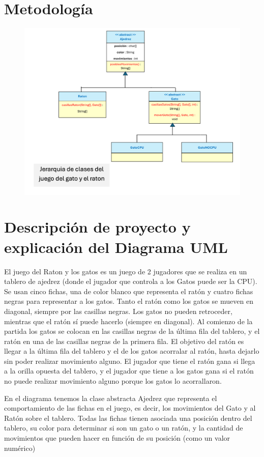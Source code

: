 \documentclass[12pt, Tahoma]{article}
\begin{document}
	\section*{Metodología}
	\begin{figure}[H]
		\centering
		\includegraphics[scale=0.6]{gatoRaton.png}
	\end{figure}
	
	\section*{Descripción de proyecto y explicación del Diagrama UML} El juego del Raton y los gatos es un juego de 2 jugadores que se realiza en un tablero de ajedrez (donde el jugador que controla a los Gatos puede ser la CPU). Se usan cinco fichas, una de color blanco que representa el ratón y cuatro fichas negras para representar a los gatos. Tanto el ratón como los gatos se mueven en diagonal, siempre por las casillas negras. Los gatos no pueden retroceder, mientras que el ratón sí puede hacerlo (siempre en diagonal). Al comienzo de la partida los gatos se colocan en las casillas negras de la última fila del tablero, y el ratón en una de las casillas negras de la primera fila. El objetivo del ratón es llegar a la última fila del tablero y el de los gatos acorralar al ratón, hasta dejarlo sin poder realizar movimiento alguno. El jugador que tiene el ratón gana si llega a la orilla opuesta del tablero, y el jugador que tiene a los gatos gana si el ratón no puede realizar movimiento alguno porque los gatos lo acorrallaron.
	
	En el diagrama tenemos la clase abstracta Ajedrez que representa el comportamiento de las fichas en el juego, es decir, los movimientos del Gato y al Ratón sobre el tablero.
	Todas las fichas tienen asociada una posición dentro del tablero, su color para determinar si son un gato o un ratón, y la cantidad de movimientos que pueden hacer en función de su posición (como un valor numérico)
	
\end{document}
